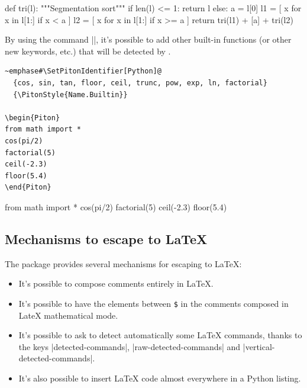 \documentclass{article}
\begin{document}
\bigskip

\begingroup


\begin{Piton}
def tri(l):
    """Segmentation sort"""
    if len(l) <= 1:
        return l
    else:
        a = l[0]
        l1 = [ x for x in l[1:] if x < a  ]
        l2 = [ x for x in l[1:] if x >= a ]
        return tri(l1) + [a] + tri(l2)
\end{Piton}

\endgroup

\bigskip
By using the command |\SetPitonIdentifier|, it's possible to add other
built-in functions (or other new keywords, etc.) that will be detected by
.


\begin{Verbatim}
~emphase#\SetPitonIdentifier[Python]@
  {cos, sin, tan, floor, ceil, trunc, pow, exp, ln, factorial}
  {\PitonStyle{Name.Builtin}}

\begin{Piton}
from math import *
cos(pi/2) 
factorial(5)
ceil(-2.3) 
floor(5.4) 
\end{Piton}
\end{Verbatim}

\begingroup

  {}

\begin{Piton}
from math import *
cos(pi/2) 
factorial(5)
ceil(-2.3) 
floor(5.4) 
\end{Piton}


\endgroup


\subsection{Mechanisms to escape to LaTeX}

\label{LaTeX-escapes}

The package  provides several mechanisms for escaping to LaTeX:
\begin{itemize}
\item It's possible to compose comments entirely in LaTeX.
\item It's possible to have the elements between \texttt{\$} in the comments
composed in LateX mathematical mode.
\item It's possible to ask  to detect automatically some LaTeX
commands, thanks to the keys |detected-commands|, |raw-detected-commands| and
|vertical-detected-commands|.
\item It's also possible to insert LaTeX code almost everywhere in a Python listing.
\end{itemize}
\end{document}
